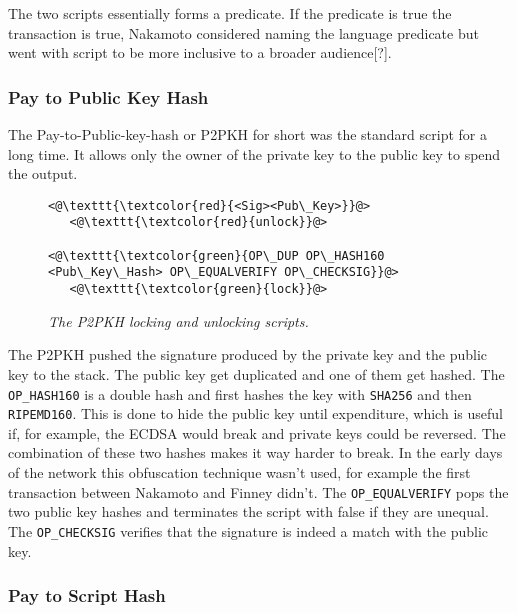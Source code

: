 The two scripts essentially forms a predicate. If the predicate is true the transaction is true, Nakamoto considered naming the language predicate but went with script to be more inclusive to a broader audience[?].

\subsubsection{Pay to Public Key Hash}

The Pay-to-Public-key-hash or P2PKH for short was the standard script for a long time. It allows only the owner of 
the private key to the public key to spend the output.


\begin{figure}[!hbt]
	
	\begin{lstlisting}
<@\texttt{\textcolor{red}{<Sig><Pub\_Key>}}@>   
   <@\texttt{\textcolor{red}{unlock}}@>
   
<@\texttt{\textcolor{green}{OP\_DUP OP\_HASH160 <Pub\_Key\_Hash> OP\_EQUALVERIFY OP\_CHECKSIG}}@>
   <@\texttt{\textcolor{green}{lock}}@>
	\end{lstlisting}
	
	\caption{\textit{ The P2PKH locking and unlocking scripts.
	}}
	\label{fig:P2PKH}
\end{figure}

The P2PKH pushed the signature produced by the private key and the public key to the stack. The public key get duplicated and one of them get hashed. The \texttt{OP\_HASH160} is a double hash and first hashes the key with \texttt{SHA256} and then \texttt{RIPEMD160}. This is done to hide the public key until expenditure, which is useful if, for example, the ECDSA would break and private keys could be reversed. The combination of these two hashes makes it way harder to break. In the early days of the network this obfuscation technique wasn't used, for example the first transaction between Nakamoto and Finney didn't\cite{nakamoto:finney:tx}.
The \texttt{OP\_EQUALVERIFY} pops the two public key hashes and terminates the script with false if they are unequal.
The \texttt{OP\_CHECKSIG} verifies that the signature is indeed a match with the public key. 

\subsubsection{Pay to Script Hash}

